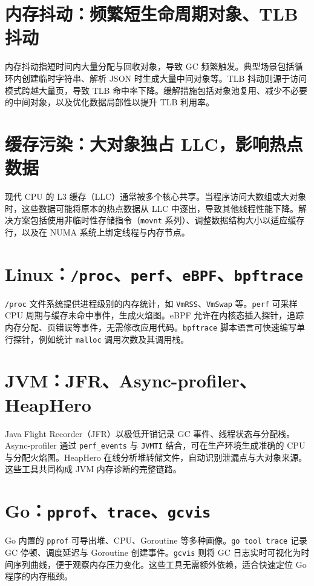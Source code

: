 \chapter{内存抖动：频繁短生命周期对象、TLB 抖动}
内存抖动指短时间内大量分配与回收对象，导致 GC 频繁触发。典型场景包括循环内创建临时字符串、解析 JSON 时生成大量中间对象等。TLB 抖动则源于访问模式跨越大量页，导致 TLB 命中率下降。缓解措施包括对象池复用、减少不必要的中间对象，以及优化数据局部性以提升 TLB 利用率。\par
\chapter{缓存污染：大对象独占 LLC，影响热点数据}
现代 CPU 的 L3 缓存（LLC）通常被多个核心共享。当程序访问大数组或大对象时，这些数据可能将原本的热点数据从 LLC 中逐出，导致其他线程性能下降。解决方案包括使用非临时性存储指令（\texttt{movnt} 系列）、调整数据结构大小以适应缓存行，以及在 NUMA 系统上绑定线程与内存节点。\par
\chapter{Linux：\texttt{/proc}、\texttt{perf}、\texttt{eBPF}、\texttt{bpftrace}}
\texttt{/proc} 文件系统提供进程级别的内存统计，如 \texttt{VmRSS}、\texttt{VmSwap} 等。\texttt{perf} 可采样 CPU 周期与缓存未命中事件，生成火焰图。eBPF 允许在内核态插入探针，追踪内存分配、页错误等事件，无需修改应用代码。\texttt{bpftrace} 脚本语言可快速编写单行探针，例如统计 \texttt{malloc} 调用次数及其调用栈。\par
\chapter{JVM：JFR、Async-profiler、HeapHero}
Java Flight Recorder（JFR）以极低开销记录 GC 事件、线程状态与分配栈。Async-profiler 通过 \texttt{perf\_{}events} 与 \texttt{JVMTI} 结合，可在生产环境生成准确的 CPU 与分配火焰图。HeapHero 在线分析堆转储文件，自动识别泄漏点与大对象来源。这些工具共同构成 JVM 内存诊断的完整链路。\par
\chapter{Go：\texttt{pprof}、\texttt{trace}、\texttt{gcvis}}
Go 内置的 \texttt{pprof} 可导出堆、CPU、Goroutine 等多种画像。\texttt{go tool trace} 记录 GC 停顿、调度延迟与 Goroutine 创建事件。\texttt{gcvis} 则将 GC 日志实时可视化为时间序列曲线，便于观察内存压力变化。这些工具无需额外依赖，适合快速定位 Go 程序的内存瓶颈。\par

